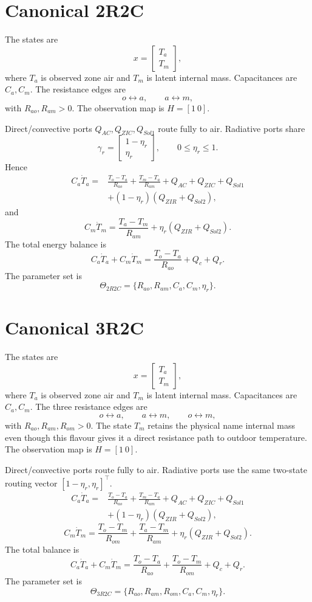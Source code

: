 \documentclass[11pt]{article}
\begin{document}
\section{Canonical 2R2C}
The states are
\[
\boxed{x=\begin{bmatrix}T_a\\T_m\end{bmatrix}},
\]
where $T_a$ is observed zone air and $T_m$ is latent internal mass. Capacitances are $C_a,C_m$. The resistance edges are
\[
\boxed{o\leftrightarrow a,\qquad a\leftrightarrow m,}
\]
with $R_{ao},R_{am}>0$. The observation map is $H=[1\ 0]$.

Direct/convective ports $Q_{AC},Q_{ZIC},Q_{Sol1}$ route fully to air. Radiative ports share
\[
\boxed{\gamma_r=\begin{bmatrix}1-\eta_r\\\eta_r\end{bmatrix},\qquad0\le\eta_r\le1.}
\]
Hence
\[
\boxed{\begin{aligned}
C_a\dot T_a={}&\frac{T_o-T_a}{R_{ao}}+\frac{T_m-T_a}{R_{am}}+Q_{AC}+Q_{ZIC}+Q_{Sol1}\\
&+(1-\eta_r)(Q_{ZIR}+Q_{Sol2}),
\end{aligned}}
\tag{2R2C-a}
\]
and
\[
\boxed{C_m\dot T_m=\frac{T_a-T_m}{R_{am}}+\eta_r(Q_{ZIR}+Q_{Sol2}).}
\tag{2R2C-m}
\]
The total energy balance is
\[
\boxed{C_a\dot T_a+C_m\dot T_m=\frac{T_o-T_a}{R_{ao}}+Q_c+Q_r.}
\]
The parameter set is
\[
\boxed{\Theta_{2R2C}=\{R_{ao},R_{am},C_a,C_m,\eta_r\}.}
\]

\section{Canonical 3R2C}
The states are
\[
\boxed{x=\begin{bmatrix}T_a\\T_m\end{bmatrix}},
\]
where $T_a$ is observed zone air and $T_m$ is latent internal mass. Capacitances are $C_a,C_m$. The three resistance edges are
\[
\boxed{o\leftrightarrow a,\qquad a\leftrightarrow m,\qquad o\leftrightarrow m,}
\]
with $R_{ao},R_{am},R_{om}>0$. The state $T_m$ retains the physical name internal mass even though this flavour gives it a direct resistance path to outdoor temperature. The observation map is $H=[1\ 0]$.

Direct/convective ports route fully to air. Radiative ports use the same two-state routing vector $[1-\eta_r,\eta_r]^\top$.
\[
\boxed{\begin{aligned}
C_a\dot T_a={}&\frac{T_o-T_a}{R_{ao}}+\frac{T_m-T_a}{R_{am}}+Q_{AC}+Q_{ZIC}+Q_{Sol1}\\
&+(1-\eta_r)(Q_{ZIR}+Q_{Sol2}),
\end{aligned}}
\tag{3R2C-a}
\]
\[
\boxed{C_m\dot T_m=\frac{T_o-T_m}{R_{om}}+\frac{T_a-T_m}{R_{am}}+\eta_r(Q_{ZIR}+Q_{Sol2}).}
\tag{3R2C-m}
\]
The total balance is
\[
\boxed{C_a\dot T_a+C_m\dot T_m=\frac{T_o-T_a}{R_{ao}}+\frac{T_o-T_m}{R_{om}}+Q_c+Q_r.}
\]
The parameter set is
\[
\boxed{\Theta_{3R2C}=\{R_{ao},R_{am},R_{om},C_a,C_m,\eta_r\}.}
\]
\end{document}
